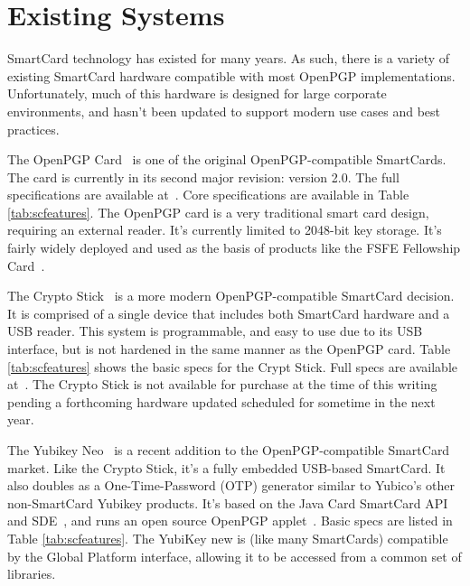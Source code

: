 \documentclass[11pt, twocolumn]{article}
\begin{document}
\section{Existing Systems}
\label{sec:exisitng}

SmartCard technology has existed for many years. As such, there is a
variety of existing SmartCard hardware compatible with most OpenPGP
implementations. Unfortunately, much of this hardware is designed for
large corporate environments, and hasn't been updated to support
modern use cases and best practices.

The OpenPGP Card~\cite{openpgpcard} is one of the original
OpenPGP-compatible SmartCards. The card is currently in its second
major revision: version 2.0. The full specifications are available
at~\cite{openpgpcard-doc-2.0}. Core specifications are available in
Table \ref{tab:scfeatures}. The OpenPGP card is a very traditional
smart card design, requiring an external reader. It's currently
limited to 2048-bit key storage. It's fairly widely deployed and used
as the basis of products like the FSFE Fellowship
Card~\cite{fellowshipcard}.

The Crypto Stick~\cite{cryptostick} is a more modern
OpenPGP-compatible SmartCard decision. It is comprised of a single
device that includes both SmartCard hardware and a USB reader. This
system is programmable, and easy to use due to its USB interface, but
is not hardened in the same manner as the OpenPGP card. Table
\ref{tab:scfeatures} shows the basic specs for the Crypt Stick. Full
specs are available at~\cite{cryptostick-wiki}. The Crypto Stick is
not available for purchase at the time of this writing pending a
forthcoming hardware updated scheduled for sometime in the next year.

The Yubikey Neo~\cite{yubikeyneo-openpgp-blog} is a recent addition to
the OpenPGP-compatible SmartCard market. Like the Crypto Stick, it's a
fully embedded USB-based SmartCard. It also doubles as a
One-Time-Password (OTP) generator similar to Yubico's other
non-SmartCard Yubikey products. It's based on the Java Card SmartCard
API and SDE~\cite{javacard}, and runs an open source OpenPGP
applet~\cite{yubikeyneo-openpgp-repo}. Basic specs are listed in Table
\ref{tab:scfeatures}.  The YubiKey new is (like many SmartCards)
compatible by the Global Platform interface\cite{globalplatform},
allowing it to be accessed from a common set of libraries.
\end{document}
